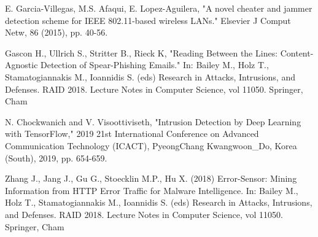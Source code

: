 \documentclass[12pt]{article} %
\begin{document}
\begin{thebibliography}{99}
 E. Garcia-Villegas, M.S. Afaqui, E. Lopez-Aguilera, "A novel cheater and jammer detection scheme for IEEE 802.11-based wireless LANs." Elsevier J Comput Netw, 86 (2015), pp. 40-56.

 Gascon H., Ullrich S., Stritter B., Rieck K, "Reading Between the Lines: Content-Agnostic Detection of Spear-Phishing Emails." In: Bailey M., Holz T., Stamatogiannakis M., Ioannidis S. (eds) Research in Attacks, Intrusions, and Defenses. RAID 2018. Lecture Notes in Computer Science, vol 11050. Springer, Cham

 N. Chockwanich and V. Visoottiviseth, "Intrusion Detection by Deep Learning with TensorFlow," 2019 21st International Conference on Advanced Communication Technology (ICACT), PyeongChang Kwangwoon\_Do, Korea (South), 2019, pp. 654-659.

Zhang J., Jang J., Gu G., Stoecklin M.P., Hu X. (2018) Error-Sensor: Mining Information from HTTP Error Traffic for Malware Intelligence. In: Bailey M., Holz T., Stamatogiannakis M., Ioannidis S. (eds) Research in Attacks, Intrusions, and Defenses. RAID 2018. Lecture Notes in Computer Science, vol 11050. Springer, Cham

\end{thebibliography}
\end{document}
